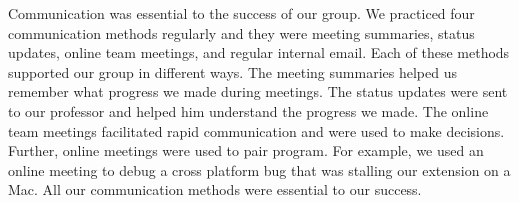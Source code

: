 Communication was essential to the success of our group.
We practiced four communication methods regularly and they were meeting summaries, status updates, online team meetings, and regular internal email.
Each of these methods supported our group in different ways.
The meeting summaries helped us remember what progress we made during meetings.
The status updates were sent to our professor and helped him understand the progress we made.
The online team meetings facilitated rapid communication and were used to make decisions.
Further, online meetings were used to pair program.
For example, we used an online meeting to debug a cross platform bug that was stalling our extension on a Mac.
All our communication methods were essential to our success.   
